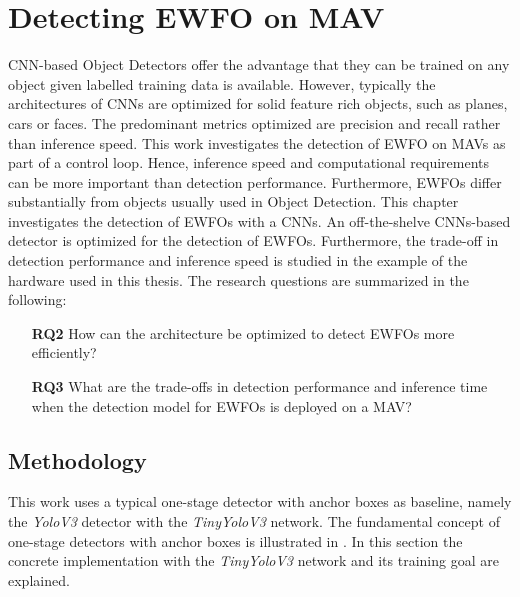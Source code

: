 	\chapter{Detecting \ac{EWFO} on \ac{MAV}}
	\label{sec:object_detection}
	
	\ac{CNN}-based Object Detectors offer the advantage that they can be trained on any object given labelled training data is available. However, typically the architectures of \acp{CNN} are optimized for solid feature rich objects, such as planes, cars or faces. The predominant metrics optimized are precision and recall rather than inference speed. This work investigates the detection of \ac{EWFO} on \acp{MAV} as part of a control loop. Hence, inference speed and computational requirements can be more important than detection performance. Furthermore, \acp{EWFO} differ substantially from objects usually used in Object Detection. This chapter investigates the detection of \acp{EWFO} with a \acp{CNN}. An off-the-shelve \acp{CNN}-based detector is optimized for the detection of \acp{EWFO}. Furthermore, the trade-off in detection performance and inference speed is studied in the example of the hardware used in this thesis. The research questions are summarized in the following:
	
\begin{enumerate}
	\item[\textbf{RQ2}]How can the architecture be optimized to detect \acp{EWFO} more efficiently?
	\item[\textbf{RQ3}]What are the trade-offs in detection performance and inference time when the detection model for \acp{EWFO} is deployed on a \ac{MAV}?
\end{enumerate}

	\section{Methodology}
		
	This work uses a typical one-stage detector with anchor boxes as baseline, namely the \textit{YoloV3} detector with the \textit{TinyYoloV3} network. The fundamental concept of one-stage detectors with anchor boxes is illustrated in . In this section the concrete implementation with the \textit{TinyYoloV3} network and its training goal are explained.
	

